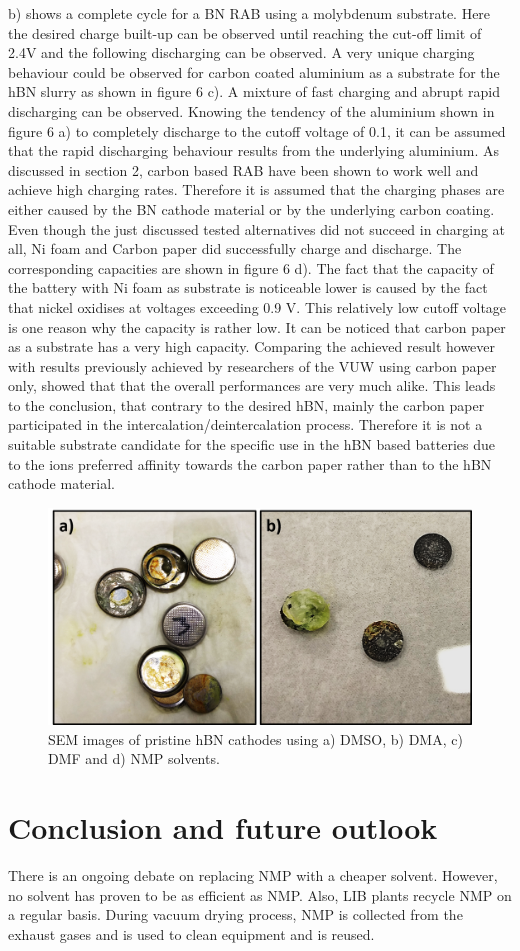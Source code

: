 b)	shows a complete cycle for a BN RAB using a molybdenum substrate. Here the desired charge built-up can be observed until reaching the cut-off limit of 2.4V and the following discharging can be observed. A very unique charging behaviour could be observed for carbon coated aluminium as a substrate for the hBN slurry as shown in figure 6 c). A mixture of fast charging and abrupt rapid discharging can be observed. Knowing the tendency of the aluminium shown in figure 6 a) to completely discharge to the cutoff voltage of 0.1, it can be assumed that the rapid discharging behaviour results from the underlying aluminium. As discussed in section 2, carbon based RAB have been shown to work well and achieve high charging rates. Therefore it is assumed that the charging phases are either caused by the BN cathode material or by the underlying carbon coating.
Even though the just discussed tested alternatives did not succeed in charging at all, Ni foam and Carbon paper did successfully charge and discharge. The corresponding capacities are shown in figure 6 d). The fact that the capacity of the battery with Ni foam as substrate is noticeable lower is caused by the fact that nickel oxidises at voltages exceeding 0.9 V. This relatively low cutoff voltage is one reason why the capacity is rather low. It can be noticed that carbon paper as a substrate has a very high capacity. Comparing the achieved result however with results previously achieved by researchers of the VUW using carbon paper only, showed that that the overall performances are very much alike. This leads to the conclusion, that contrary to the desired hBN, mainly the carbon paper participated in the intercalation/deintercalation process. Therefore it is not a suitable substrate candidate for the specific use in the hBN based batteries due to the ions preferred affinity towards the carbon paper rather than to the hBN cathode material.
\begin{figure}[tbh!]
\centering
\includegraphics[width=\textwidth]{Figures/chap7fig/steeleffect}
\caption{SEM images of pristine hBN cathodes using a) DMSO, b) DMA, c) DMF and d) NMP solvents.}
\label{Figures/chap7fig:steeleffect}
\end{figure}
\section{Conclusion and future outlook}
There is an ongoing debate on replacing NMP with a cheaper solvent. However, no solvent has proven to be as efficient as NMP. Also, LIB plants recycle NMP on a regular basis. During vacuum drying process, NMP is collected from the exhaust gases and is used to clean equipment and is reused.  